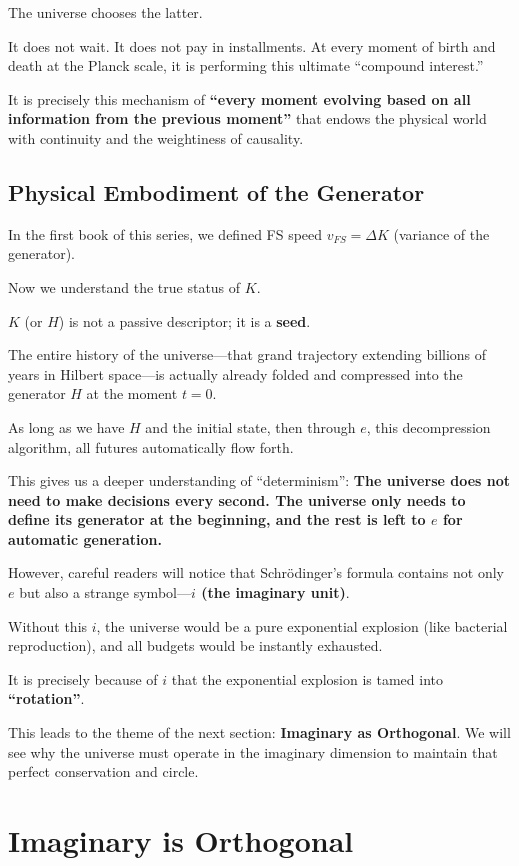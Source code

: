 \documentclass[11pt,a4paper,twoside]{book}
\begin{document}
The universe chooses the latter.

It does not wait. It does not pay in installments. At every moment of birth and death at the Planck scale, it is performing this ultimate ``compound interest.''

It is precisely this mechanism of \textbf{``every moment evolving based on all information from the previous moment''} that endows the physical world with continuity and the weightiness of causality.

\subsection{Physical Embodiment of the Generator}

In the first book of this series, we defined FS speed $v_{FS} = \Delta K$ (variance of the generator).

Now we understand the true status of $K$.

$K$ (or $H$) is not a passive descriptor; it is a \textbf{seed}.

The entire history of the universe---that grand trajectory extending billions of years in Hilbert space---is actually already folded and compressed into the generator $H$ at the moment $t=0$.

As long as we have $H$ and the initial state, then through \textbf{$e$}, this decompression algorithm, all futures automatically flow forth.

This gives us a deeper understanding of ``determinism'': \textbf{The universe does not need to make decisions every second. The universe only needs to define its generator at the beginning, and the rest is left to $e$ for automatic generation.}

However, careful readers will notice that Schrödinger's formula contains not only $e$ but also a strange symbol---\textbf{$i$ (the imaginary unit)}.

Without this $i$, the universe would be a pure exponential explosion (like bacterial reproduction), and all budgets would be instantly exhausted.

It is precisely because of $i$ that the exponential explosion is tamed into \textbf{``rotation''}.

This leads to the theme of the next section: \textbf{Imaginary as Orthogonal}. We will see why the universe must operate in the imaginary dimension to maintain that perfect conservation and circle.

 \section{Imaginary is Orthogonal}
\end{document}
